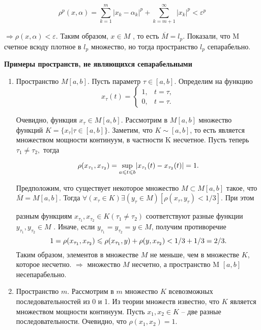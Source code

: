 \begin{enumerate}
              $$\rho^p(x, \alpha) = \stackrel{m}{\underset{k=1}{\sum}}|x_k-\alpha_k|^p+
                  \stackrel{\infty}{\underset{k=m+1}{\sum}}|x_k|^p<
                  \varepsilon^p$$

              $\Rightarrow\rho(x, \alpha) < \varepsilon $. Таким образом, $x \in  M$ ,
              то есть $\overline{M} = l_p$.
              Показали, что M счетное всюду плотное в $l_p$ множество, но тогда пространство $l_p$ сепарабельно.
    \end{enumerate}

    \noindent\dotfill
    
    \textbf{Примеры пространств, не являющихся сепарабельными}

    \begin{enumerate}
        \item     Пространство $M [a, b]$. Пусть параметр $\tau \in  [a, b]$. Определим на функцию
              $$x_\tau (t) =
                  \begin{cases}
                      1, & t = \tau, \\
                      0, & t= \tau.
                  \end{cases}	$$

              Очевидно, функция $x_\tau \in  M [a, b]$. Рассмотрим в $M [a, b]$
              множество функций
              $K = \{x_\tau | \tau \in  [a, b] \}$.
              Заметим, что $K \sim [a, b]$, то есть является
              множеством мощности континуум, в частности K несчетное.
              Пусть теперь $\tau_1 \neq \tau_2,$ тогда


              $$\rho(x_{\tau_1} , x_{\tau_2} ) = \underset{a\leqslant  t \leqslant  b}{\sup}
                  |x_{\tau_1} (t)- x_{\tau_2} (t)| = 1.$$

              Предположим, что существует некоторое множество $M \subset M [a, b]$ такое,
              что
              $\overline{M}   =  M [a, b]$.
              Тогда
              $\forall(x_\tau   \in   K)\exists(y_\tau   \in   M )[ \rho(x_\tau , y_\tau )
                      <  1/3 ]$.  При  этом


              разным функциям $x_{\tau_1} , x_{\tau_2}   \in  K  (\tau_1\neq\tau_2)$
              соответствуют разные функции
              $y_{\tau_1} , y_{\tau_2} \in  M$ .
              Иначе, если $y_{\tau_1} = y_{\tau_2} = y \in  M $, получим противоречие
              $$1 = \rho(x_{\tau_1} , x_{\tau_2} ) \leqslant  \rho(x_{\tau_1} , y) +
                  \rho(y, x_{\tau_2} ) < 1/3 + 1/3 = 2/3.$$
              Таким образом, элементов в множестве $M$ не меньше, чем в множестве $K$,
              которое несчетно.
              $\Rightarrow$ множество $M$ несчетно, а пространство M $[a, b]$
              несепарабельно.
        \item	Пространство $m$. Рассмотрим в $m$ множество $K$ всевозможных
              последовательностей из 0 и 1. Из теории множеств известно, что $K$
              является множеством
              мощности континуум. Пусть $x_1, x_2 \in  K$ – две разные
              последовательности. Очевидно,
              что $\rho(x_1, x_2) = 1$.


\end{enumerate}
